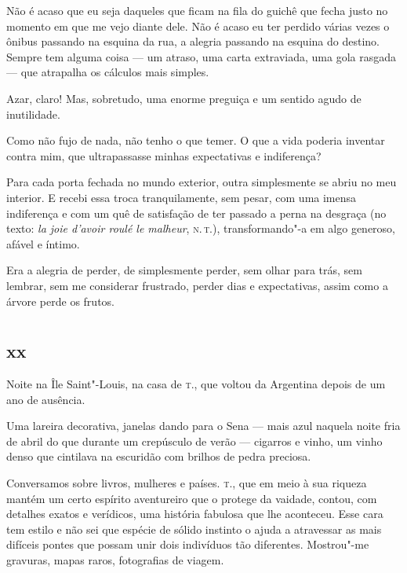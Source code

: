 Não é acaso que eu seja daqueles que ficam na fila do guichê que fecha
justo no momento em que me vejo diante dele. Não é acaso eu ter perdido
várias vezes o ônibus passando na esquina da rua, a
alegria passando na esquina do destino. Sempre tem alguma coisa --- um
atraso, uma carta extraviada, uma gola rasgada --- que
atrapalha os cálculos mais simples.

Azar, claro! Mas, sobretudo, uma enorme preguiça e um sentido agudo de inutilidade.

Como não fujo de nada, não tenho o que temer. O que a vida poderia
inventar contra mim, que ultrapassasse minhas expectativas e indiferença?

Para cada porta fechada no mundo exterior, outra simplesmente se abriu
no meu interior. E recebi essa troca tranquilamente, sem pesar, com uma
imensa indiferença e com um quê de satisfação de ter
passado a perna na desgraça (no texto: \textit{la joie d'avoir roulé le
malheur}, \textsc{n.\,t.}), transformando"-a em algo generoso, afável e íntimo.

Era a alegria de perder, de simplesmente perder, sem olhar para trás,
sem lembrar, sem me considerar frustrado, perder dias e expectativas,
assim como a árvore perde os frutos.



\chapter*{}
\section{xx}

\noindent{}Noite na Île Saint"-Louis, na casa de \textsc{t.}, que voltou da Argentina depois
de um ano de ausência.

Uma lareira decorativa, janelas dando para o Sena --- mais azul naquela
noite fria de abril do que durante um crepúsculo de verão --- cigarros e
vinho, um vinho denso que cintilava na escuridão com brilhos de pedra
preciosa.

Conversamos sobre livros, mulheres e países. \textsc{t.}, que em meio à sua
riqueza mantém um certo espírito aventureiro que o protege da vaidade,
contou, com detalhes exatos e verídicos, uma história fabulosa que lhe
aconteceu. Esse cara tem estilo e não sei que espécie de sólido
instinto o ajuda a atravessar as mais difíceis pontes que possam
unir dois indivíduos tão diferentes. Mostrou"-me gravuras, mapas raros,
fotografias de viagem.

